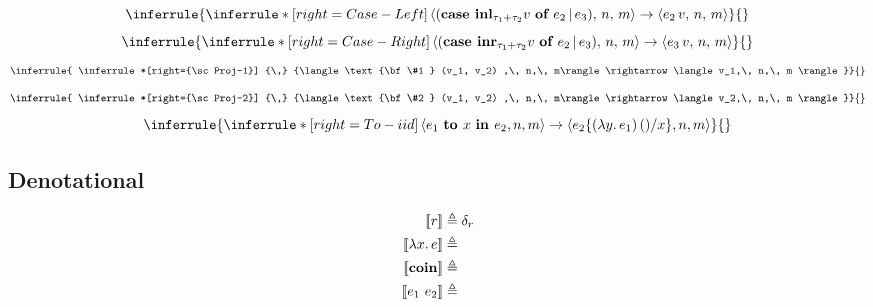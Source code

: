 \documentclass{article}
\begin{document}
\begin{multicols}{2}
				\begin{equation*}
				\inferrule{
				\inferrule*[right={\sc Case-Left}]
				{\,}
				{\langle (\text{\bf case } {\bf inl}_{\tau_1 + \tau_2} v \text{ \bf of } e_2 \,|\, e_3) ,\, n,\, m\rangle \rightarrow \langle e_2\, v,\, n,\, m \rangle}}
				{}
			\end{equation*}
				\begin{equation*}
				\inferrule{
				\inferrule*[right={\sc Case-Right}]
				{\,}
				{\langle (\text{\bf case } {\bf inr}_{\tau_1 + \tau_2} v \text{ \bf of } e_2 \,|\, e_3) ,\, n,\, m\rangle \rightarrow \langle e_3\, v,\, n,\, m \rangle}}
				{}
			\end{equation*}
				\begin{equation*}
				\inferrule{
				\inferrule*[right={\sc Proj-1}]
				{\,}
				{\langle \text{\bf \#1 } (v_1, v_2) ,\, n,\, m\rangle \rightarrow \langle v_1,\, n,\, m \rangle}}
				{}
			\end{equation*}
				\begin{equation*}
				\inferrule{
				\inferrule*[right={\sc Proj-2}]
				{\,}
				{\langle \text{\bf \#2 } (v_1, v_2) ,\, n,\, m\rangle \rightarrow \langle v_2,\, n,\, m \rangle}}
				{}
			\end{equation*}
			\begin{equation*}
				\inferrule{
				\inferrule*[right={\sc To-iid}]
				{\,}
				{\langle e_1 \text{ \bf to } x \text{ \bf in } e_2, n, m \rangle \to 
				\langle e_2 \{ (\lambda y.\, e_1) \, () / x \}, n, m \rangle}}
				{}
			\end{equation*}
		\end{multicols}
		
	\subsection{Denotational}
		\begin{equation*}
		\begin{split}
			[\![r]\!] &\triangleq \delta_r \\
			[\![\lambda x.\, e]\!] &\triangleq  \\
			[\![{\bf coin}]\!] &\triangleq \\
			[\![e_1 \text{ } e_2]\!] &\triangleq \\
		\end{split}
	\end{equation*}
\end{document}
